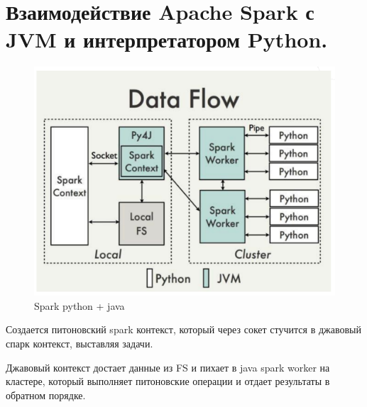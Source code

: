 \section{Взаимодействие Apache Spark с JVM и интерпретатором Python.}

\begin{figure}[H]
	\centering
	\begin{minipage}[b]{0.6\textwidth}
		\includegraphics[width=\textwidth]{images/pyjspark.png}
		\caption{Spark python + java}
	\end{minipage}
\end{figure}

Создается питоновский spark контекст, который через сокет
стучится в джавовый спарк контекст, выставляя задачи.

Джавовый контекст достает данные из FS и пихает в java
spark worker на кластере, который выполняет питоновские
операции и отдает результаты в обратном порядке.